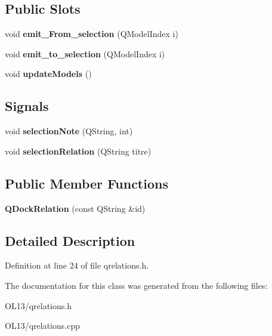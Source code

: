 \subsection*{Public Slots}
\begin{DoxyCompactItemize}
\item 
\mbox{\label{class_q_dock_relation_a6072a6081826939baded79153ecbf341}} 
void {\bfseries emit\+\_\+\+From\+\_\+selection} (Q\+Model\+Index i)
\item 
\mbox{\label{class_q_dock_relation_aeb73f1a25957fb93815d3a47e1eed931}} 
void {\bfseries emit\+\_\+to\+\_\+selection} (Q\+Model\+Index i)
\item 
\mbox{\label{class_q_dock_relation_a3d3bd086c56c255eca9e0991359f0f84}} 
void {\bfseries update\+Models} ()
\end{DoxyCompactItemize}
\subsection*{Signals}
\begin{DoxyCompactItemize}
\item 
\mbox{\label{class_q_dock_relation_a8e6f45fa1d280057fba260274385b8b1}} 
void {\bfseries selection\+Note} (Q\+String, int)
\item 
\mbox{\label{class_q_dock_relation_a00c9f94b747cb5e552db374bf9c1781c}} 
void {\bfseries selection\+Relation} (Q\+String titre)
\end{DoxyCompactItemize}
\subsection*{Public Member Functions}
\begin{DoxyCompactItemize}
\item 
\mbox{\label{class_q_dock_relation_a3cef55579cbcd3a665253b62876f69dc}} 
{\bfseries Q\+Dock\+Relation} (const Q\+String \&id)
\end{DoxyCompactItemize}


\subsection{Detailed Description}


Definition at line 24 of file qrelations.\+h.



The documentation for this class was generated from the following files\+:\begin{DoxyCompactItemize}
\item 
O\+L13/qrelations.\+h\item 
O\+L13/qrelations.\+cpp\end{DoxyCompactItemize}

